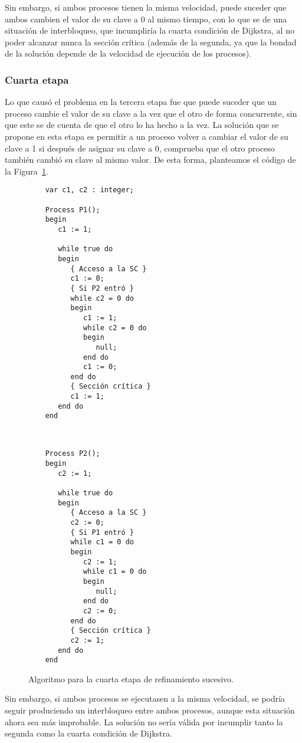 Sin embargo, si ambos procesos tienen la misma velocidad, puede suceder que ambos cambien el valor de su clave a 0 al mismo tiempo, con lo que se de una situación de interbloqueo, que incumpliría la cuarta condición de Dijkstra, al no poder alcanzar nunca la sección crítica (además de la segunda, ya que la bondad de la solución depende de la velocidad de ejecución de los procesos).

\subsubsection{Cuarta etapa}
Lo que causó el problema en la tercera etapa fue que puede suceder que un proceso cambie el valor de su clave a la vez que el otro de forma concurrente, sin que este se de cuenta de que el otro lo ha hecho a la vez. La solución que se propone en esta etapa es permitir a un proceso volver a cambiar el valor de su clave a 1 si después de asignar su clave a 0, comprueba que el otro proceso también cambió su clave al mismo valor. De esta forma, planteamos el código de la Figura~\ref{fig:cod_cuarta_etapa}.\\
\begin{figure}
\setlength{\columnsep}{1cm}
\begin{multicols}{2}
    \begin{verbatim}
    var c1, c2 : integer;

    Process P1();
    begin
       c1 := 1;

       while true do
       begin
          { Acceso a la SC }
          c1 := 0;
          { Si P2 entró }
          while c2 = 0 do
          begin
             c1 := 1;
             while c2 = 0 do
             begin
                null;
             end do
             c1 := 0;
          end do
          { Sección crítica }
          c1 := 1;
       end do
    end
\end{verbatim}
\begin{verbatim}


    Process P2();
    begin
       c2 := 1;

       while true do
       begin
          { Acceso a la SC }
          c2 := 0;
          { Si P1 entró }
          while c1 = 0 do
          begin
             c2 := 1;
             while c1 = 0 do
             begin
                null;
             end do
             c2 := 0;
          end do
          { Sección crítica }
          c2 := 1;
       end do
    end
\end{verbatim}
\end{multicols}
\caption{Algoritmo para la cuarta etapa de refinamiento sucesivo.}
\label{fig:cod_cuarta_etapa}
\end{figure}
Sin embargo, si ambos procesos se ejecutasen a la misma velocidad, se podría seguir produciendo un interbloqueo entre ambos procesos, aunque esta situación ahora sea más improbable. La solución no sería válida por incumplir tanto la segunda como la cuarta condición de Dijkstra.\\

